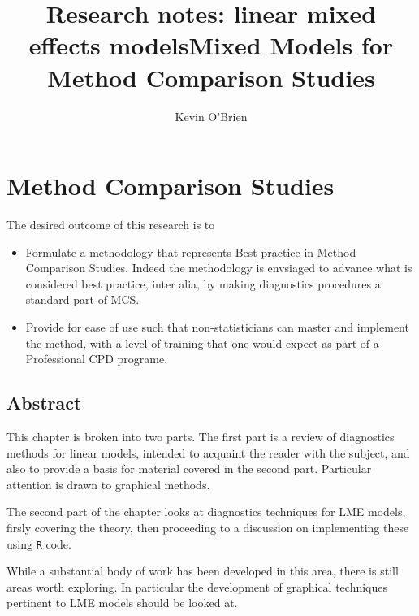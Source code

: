 \documentclass[12pt, a4paper]{report}
\title{Research notes: linear mixed effects models}
\author{ } \date{ }
\theoremstyle{plain}
\theoremstyle{definition}
\theoremstyle{remark}
\begin{document}
	\author{Kevin O'Brien}
	\title{Mixed Models for Method Comparison Studies}
	\tableofcontents




\chapter{Method Comparison Studies}
	
	The desired outcome of this research is to
	
	\begin{itemize}
		\item Formulate a methodology that represents Best practice in Method Comparison Studies. Indeed the methodology is envsiaged to advance what is considered best practice, inter alia, by making diagnostics procedures a standard part of MCS. 
		
		\item Provide for ease of use such that non-statisticians can master and implement the method, with a level of training that one would expect 
		as part of a Professional CPD programe.
		
	\end{itemize}
\section*{Abstract}
This chapter is broken into two parts. The first part is a review of diagnostics methods for linear models, intended to acquaint the reader with the subject, and also to provide a basis for material covered in the second part. Particular attention is drawn to graphical methods.

The second part of the chapter looks at diagnostics techniques for LME models, firsly covering the theory, then proceeding to a discussion on 
implementing these using \texttt{R} code.

While a substantial body of work has been developed in this area, there is still areas worth exploring. 
In particular the development of graphical techniques pertinent to LME models should be looked at.




%
%
%
%
\end{document}
